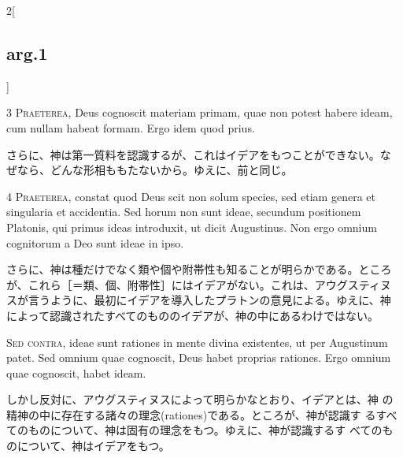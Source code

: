 \documentclass[paper=a4paper,fontsize=10pt,jafontsize=9pt,titlepage]{jlreq}
\begin{document}
\begin{paracol}{2}[\subsection{arg.1}]

{\scshape 3 Praeterea}, Deus cognoscit materiam primam, quae non
potest habere ideam, cum nullam habeat formam. Ergo idem quod prius.

\switchcolumn

さらに、神は第一質料を認識するが、これはイデアをもつことができない。な
ぜなら、どんな形相ももたないから。ゆえに、前と同じ。


{\scshape 4 Praeterea}, constat quod Deus scit non solum species, sed
etiam genera et singularia et accidentia. Sed horum non sunt ideae,
secundum positionem Platonis, qui primus ideas introduxit, ut dicit
Augustinus. Non ergo omnium cognitorum a Deo sunt ideae in ipso.

\switchcolumn

さらに、神は種だけでなく類や個や附帯性も知ることが明らかである。ところ
が、これら［＝類、個、附帯性］にはイデアがない。これは、アウグスティヌ
スが言うように、最初にイデアを導入したプラトンの意見による。ゆえに、神
によって認識されたすべてのもののイデアが、神の中にあるわけではない。

\switchcolumn*[\subsection{s.c.}]

{\scshape Sed contra}, ideae sunt rationes in mente divina existentes,
ut per Augustinum patet. Sed omnium quae cognoscit, Deus habet
proprias rationes. Ergo omnium quae cognoscit, habet ideam.

\switchcolumn

しかし反対に、アウグスティヌスによって明らかなとおり、イデアとは、神
 の精神の中に存在する諸々の理念(rationes)である。ところが、神が認識す
 るすべてのものについて、神は固有の理念をもつ。ゆえに、神が認識するす
 べてのものについて、神はイデアをもつ。



\end{paracol}
\end{document}

